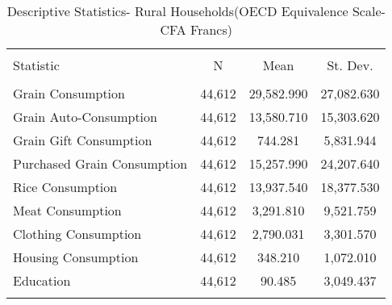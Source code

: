 
\begin{table}[!htbp] \centering 
  \caption{Descriptive Statistics- Rural Households(OECD Equivalence Scale-CFA Francs)} 
  \label{} 
\begin{tabular}{@{\extracolsep{5pt}}lccc} 
\\[-1.8ex]\hline 
\hline \\[-1.8ex] 
Statistic & \multicolumn{1}{c}{N} & \multicolumn{1}{c}{Mean} & \multicolumn{1}{c}{St. Dev.} \\ 
\hline \\[-1.8ex] 
Grain Consumption & 44,612 & 29,582.990 & 27,082.630 \\ 
Grain Auto-Consumption & 44,612 & 13,580.710 & 15,303.620 \\ 
 Grain Gift Consumption & 44,612 & 744.281 & 5,831.944 \\ 
 Purchased Grain Consumption & 44,612 & 15,257.990 & 24,207.640 \\ 
Rice Consumption & 44,612 & 13,937.540 & 18,377.530 \\ 
Meat Consumption & 44,612 & 3,291.810 & 9,521.759 \\ 
 Clothing Consumption & 44,612 & 2,790.031 & 3,301.570 \\ 
 Housing Consumption & 44,612 & 348.210 & 1,072.010 \\ 
 Education  & 44,612 & 90.485 & 3,049.437 \\ 
\hline \\[-1.8ex] 
\end{tabular} 
\end{table} 
